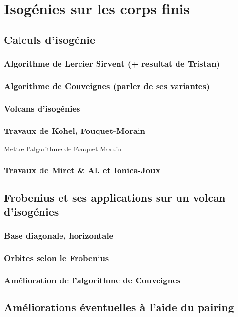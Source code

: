\documentclass[10pt,a4paper]{book}
\theoremstyle{plain}
\theoremstyle{definition}
\theoremstyle{definition}
\theoremstyle{definition}
\theoremstyle{definition}
\theoremstyle{remark}
\theoremstyle{remark}
\begin{document}
\chapter{Isogénies sur les corps finis}

\section{Calculs d'isogénie}
\subsection{Algorithme de Lercier Sirvent (+ resultat de Tristan)}
\subsection{Algorithme de Couveignes (parler de ses variantes)}

\subsection{Volcans d'isogénies}
\subsection{Travaux de Kohel, Fouquet-Morain}
Mettre l'algorithme de Fouquet Morain
\subsection{Travaux de Miret \& Al. et Ionica-Joux}


\section{Frobenius et ses applications sur un volcan d'isogénies}
\subsection{Base diagonale, horizontale}
\subsection{Orbites selon le Frobenius}
\subsection{Amélioration de l'algorithme de Couveignes}

\section{Améliorations éventuelles à l'aide du pairing}



\end{document}
